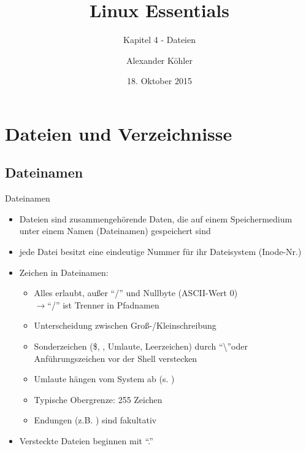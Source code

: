 \documentclass[aspectratio=43]{beamer}
\title[Linux Essentials  - Kapitel 4 - Dateien]{Linux Essentials}
\subtitle{Kapitel 4 - Dateien}
\author{Alexander Köhler}
\date{18. Oktober 2015}
\begin{document}
\logoframe

\frame{\titlepage}

\setcounter{tocdepth}{1}
\section[Gliederung]{}
\frame{\tableofcontents}


\section{Dateien und Verzeichnisse}
\subsection{Dateinamen}
\begin{frame}{Dateinamen}
    \begin{itemize}
      \item Dateien sind zusammengehörende Daten, die auf einem Speichermedium unter einem
        Namen (Dateinamen) gespeichert sind
      \item jede Datei besitzt eine eindeutige Nummer für ihr Dateisystem (Inode-Nr.)
      \item Zeichen in Dateinamen:
      \begin{itemize}
        \item Alles erlaubt, außer ``/'' und Nullbyte (ASCII-Wert 0)\\
          $\rightarrow$``/'' ist Trenner in Pfadnamen
        \item Unterscheidung zwischen Groß-/Kleinschreibung
        \item Sonderzeichen (\$, \textasteriskcentered, Umlaute, Leerzeichen) durch ``\textbackslash''oder 
        Anführungszeichen vor der Shell verstecken
        \item Umlaute hängen vom System ab (s. )
        \item Typische Obergrenze: 255 Zeichen
      \item Endungen (z.B. ) sind fakultativ
      \end{itemize}
      \item Versteckte Dateien beginnen mit ``.''
    \end{itemize}
\end{frame}
\end{document}
